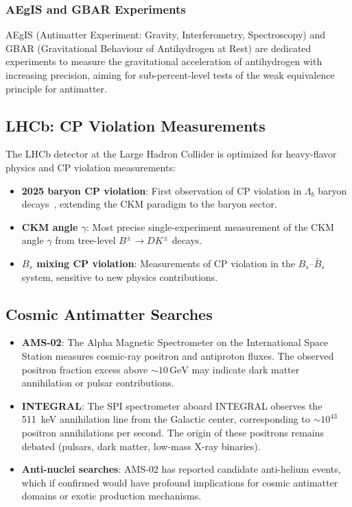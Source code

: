 \documentclass[12pt]{article}
\theoremstyle{definition}
\theoremstyle{remark}
\newcommand{\GeV}{\,\text{GeV}}
\begin{document}
\subsubsection{AEgIS and GBAR Experiments}

AEgIS (Antimatter Experiment: Gravity, Interferometry, Spectroscopy) and GBAR
(Gravitational Behaviour of Antihydrogen at Rest) are dedicated experiments to
measure the gravitational acceleration of antihydrogen with increasing precision,
aiming for sub-percent-level tests of the weak equivalence principle for antimatter.

\subsection{LHCb: CP Violation Measurements}

The LHCb detector at the Large Hadron Collider is optimized for heavy-flavor physics
and CP violation measurements:

\begin{itemize}
    \item \textbf{2025 baryon CP violation}: First observation of CP violation in
    $\Lambda_b$ baryon decays~\cite{LHCb2025}, extending the CKM paradigm to the
    baryon sector.

    \item \textbf{CKM angle $\gamma$}: Most precise single-experiment measurement
    of the CKM angle $\gamma$ from tree-level $B^\pm \to DK^\pm$ decays.

    \item \textbf{$B_s$ mixing CP violation}: Measurements of CP violation in the
    $B_s$--$\bar{B}_s$ system, sensitive to new physics contributions.
\end{itemize}

\subsection{Cosmic Antimatter Searches}

\begin{itemize}
    \item \textbf{AMS-02}: The Alpha Magnetic Spectrometer on the International Space
    Station measures cosmic-ray positron and antiproton fluxes. The observed positron
    fraction excess above $\sim 10\GeV$ may indicate dark matter annihilation or
    pulsar contributions.

    \item \textbf{INTEGRAL}: The SPI spectrometer aboard INTEGRAL observes the
    511~keV annihilation line from the Galactic center, corresponding to $\sim 10^{43}$
    positron annihilations per second. The origin of these positrons remains debated
    (pulsars, dark matter, low-mass X-ray binaries).

    \item \textbf{Anti-nuclei searches}: AMS-02 has reported candidate anti-helium
    events, which if confirmed would have profound implications for cosmic antimatter
    domains or exotic production mechanisms.
\end{itemize}
\end{document}

